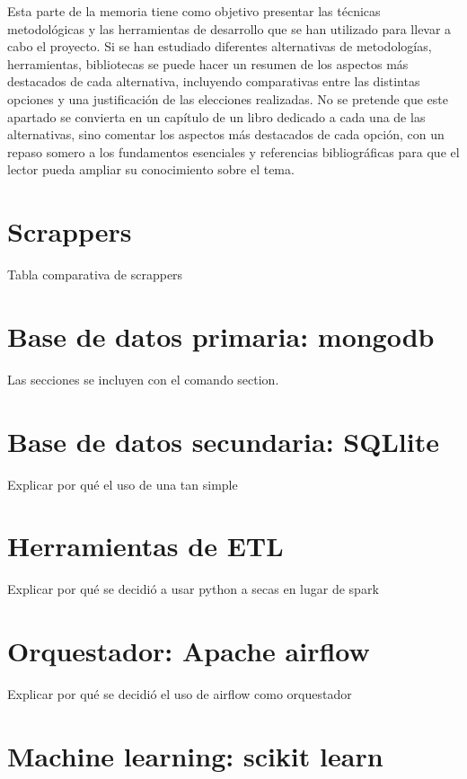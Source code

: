 
Esta parte de la memoria tiene como objetivo presentar las técnicas metodológicas y las herramientas de desarrollo que se han utilizado para llevar a cabo el proyecto. Si se han estudiado diferentes alternativas de metodologías, herramientas, bibliotecas se puede hacer un resumen de los aspectos más destacados de cada alternativa, incluyendo comparativas entre las distintas opciones y una justificación de las elecciones realizadas. 
No se pretende que este apartado se convierta en un capítulo de un libro dedicado a cada una de las alternativas, sino comentar los aspectos más destacados de cada opción, con un repaso somero a los fundamentos esenciales y referencias bibliográficas para que el lector pueda ampliar su conocimiento sobre el tema.

\section{Scrappers}

Tabla comparativa de scrappers

\section{Base de datos primaria: mongodb}

Las secciones se incluyen con el comando section.

\section{Base de datos secundaria: SQLlite}

Explicar por qué el uso de una tan simple

\section{Herramientas de ETL}

Explicar por qué se decidió a usar python a secas en lugar de spark

\section{Orquestador: Apache airflow}

Explicar por qué se decidió el uso de airflow como orquestador

\section{Machine learning: scikit learn}

